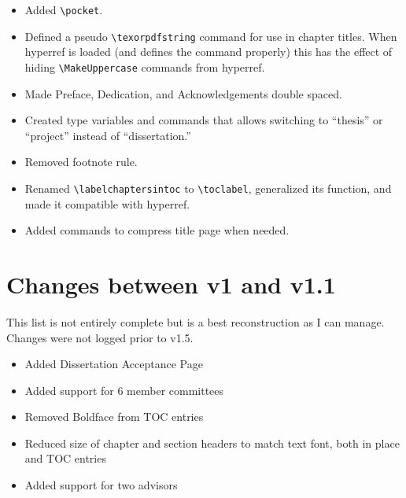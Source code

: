 \begin{itemize}
\item{Added \verb=\pocket=.}
\item{Defined a pseudo \verb=\texorpdfstring= command for use in chapter titles.  When hyperref is loaded (and defines the command properly) this has the effect of hiding \verb=\MakeUppercase= commands from hyperref.}
\item{Made Preface, Dedication, and Acknowledgements double spaced.}
\item{Created type variables and commands that allows switching to ``thesis'' or ``project'' instead of ``dissertation.''}
\item{Removed footnote rule.}
\item{Renamed \verb=\labelchaptersintoc= to \verb=\toclabel=, generalized its function, and made it compatible with hyperref.}
\item{Added commands to compress title page when needed.}
\end{itemize}

\section{Changes between v1 and v1.1}
This list is not entirely complete but is a best reconstruction as I can manage.  Changes were not logged prior to v1.5.
\begin{itemize}
\item{Added Dissertation Acceptance Page}
\item{Added support for 6 member committees}
\item{Removed Boldface from TOC entries}
\item{Reduced size of chapter and section headers to match text font, both in place and TOC entries}
\item{Added support for two advisors}

\end{itemize}

\endinput
